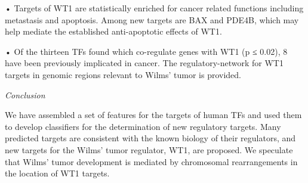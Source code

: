 • Targets of WT1 are statistically enriched for cancer related functions including metastasis and apoptosis. Among new targets are BAX and PDE4B, which may help mediate the established anti-apoptotic effects of WT1.

• Of the thirteen TFs found which co-regulate genes with WT1 (p ≤ 0.02), 8 have been previously implicated in cancer. The regulatory-network for WT1 targets in genomic regions relevant to Wilms' tumor is provided.

{\it Conclusion}

We have assembled a set of features for the targets of human TFs and used them to develop classifiers for the determination of new regulatory targets. Many predicted targets are consistent with the known biology of their regulators, and new targets for the Wilms' tumor regulator, WT1, are proposed. We speculate that Wilms' tumor development is mediated by chromosomal rearrangements in the location of WT1 targets.
